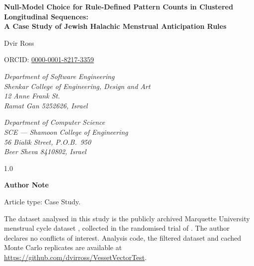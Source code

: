 \documentclass[12pt]{article}
\begin{document}
\begin{titlepage}
  \centering
  \vspace*{0.4cm}
  {\large\bfseries Null-Model Choice for Rule-Defined Pattern Counts in Clustered
  Longitudinal Sequences:\\[4pt]
  \normalfont\large A Case Study of Jewish Halachic Menstrual Anticipation Rules\par}
  \vspace{0.7cm}
  {Dvir Ross\par}
  \vspace{0.2cm}
  {\small ORCID: \href{https://orcid.org/0000-0001-8217-3359}{0000-0001-8217-3359}\par}
  \vspace{0.4cm}
  \begin{minipage}[t]{0.46\textwidth}
    \centering\small\itshape
    Department of Software Engineering\\
    Shenkar College of Engineering, Design and Art\\
    12 Anne Frank St.\\
    Ramat Gan 5252626, Israel
  \end{minipage}\hfill
  \begin{minipage}[t]{0.46\textwidth}
    \centering\small\itshape
    Department of Computer Science\\
    SCE --- Shamoon College of Engineering\\
    56 Bialik Street, P.O.B.\ 950\\
    Beer Sheva 8410802, Israel
  \end{minipage}
  \vspace{0.6cm}
  \begin{spacing}{1.0}
  {\normalsize\bfseries Author Note\par}
  \vspace{0.2cm}
  \begin{flushleft}
  Article type: Case Study.

  \medskip
  The dataset analysed in this study is the publicly archived Marquette University
  menstrual cycle dataset \citep{fehring2012data}, collected in the randomised trial of
  \citet{fehring2013}. The author declares no conflicts of interest. Analysis code, the
  filtered dataset and cached Monte Carlo replicates are available at
  \url{https://github.com/dvirross/VessetVectorTest}.


\end{flushleft}
\end{spacing}
\end{titlepage}
\end{document}
